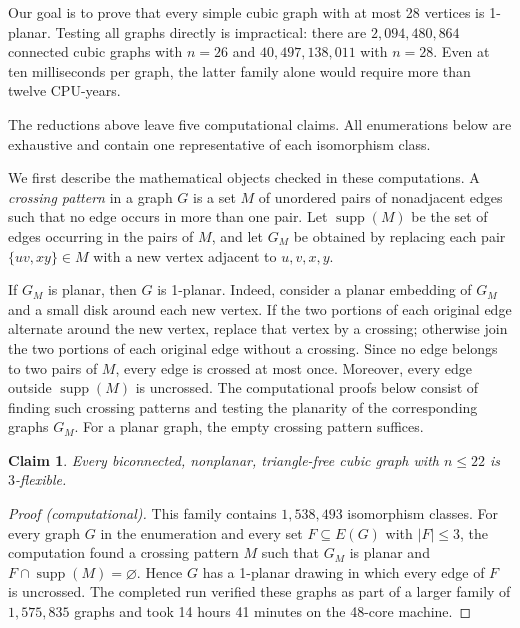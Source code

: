 \documentclass[a4paper,11pt]{article}
\theoremstyle{plain}
\newtheorem{claim}{Claim}
\theoremstyle{definition}  %
\begin{document}
Our goal is to prove that every simple cubic graph with at most 28 vertices
is 1-planar.  Testing all graphs directly is impractical: there are
$2{,}094{,}480{,}864$ connected cubic graphs with $n=26$ and
$40{,}497{,}138{,}011$ with $n=28$.  Even at ten milliseconds per graph, the
latter family alone would require more than twelve CPU-years.

The reductions above leave five computational claims.  All enumerations below
are exhaustive and contain one representative of each isomorphism class.

We first describe the mathematical objects checked in these computations.  A
\emph{crossing pattern} in a graph $G$ is a set $M$ of unordered pairs of
nonadjacent edges such that no edge occurs in more than one pair.  Let
$\operatorname{supp}(M)$ be the set of edges occurring in the pairs of $M$,
and let $G_M$ be obtained by replacing each pair $\{uv,xy\}\in M$ with a new
vertex adjacent to $u,v,x,y$.

If $G_M$ is planar, then $G$ is 1-planar.  Indeed, consider a planar embedding
of $G_M$ and a small disk around each new vertex.  If the two portions of each
original edge alternate around the new vertex, replace that vertex by a
crossing; otherwise join the two portions of each original edge without a
crossing.  Since no edge belongs to two pairs of $M$, every edge is crossed at
most once.  Moreover, every edge outside $\operatorname{supp}(M)$ is
uncrossed.  The computational proofs below consist of finding such crossing
patterns and testing the planarity of the corresponding graphs $G_M$.  For a
planar graph, the empty crossing pattern suffices.

\begin{claim}\label{clm:flexible22}
    Every biconnected, nonplanar, triangle-free cubic graph with
    $n\leq 22$ is $3$-flexible.
\end{claim}

\begin{proof}[Proof (computational)]
    This family contains $1{,}538{,}493$ isomorphism classes.  For every
    graph $G$ in the enumeration and every set
    $F\subseteq E(G)$ with $|F|\leq 3$, the computation found a crossing
    pattern $M$ such that $G_M$ is planar and
    $F\cap\operatorname{supp}(M)=\varnothing$.  Hence $G$ has a 1-planar
    drawing in which every edge of $F$ is uncrossed.  The completed run
    verified these graphs as part of a larger family of $1{,}575{,}835$
    graphs and took 14 hours 41 minutes on the 48-core machine.
\end{proof}
\end{document}
